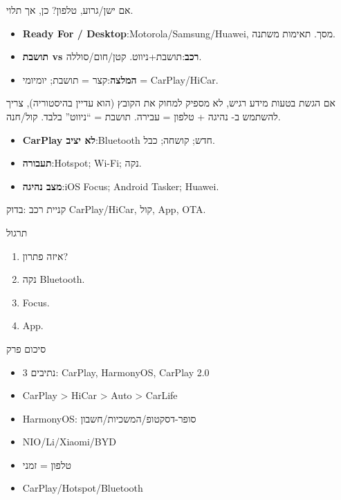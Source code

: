 
אם ישן/גרוע, טלפון? כן, אך תלוי.

\begin{itemize}
  \item \textbf{Ready For / Desktop}:Motorola/Samsung/Huawei, מסך. תאימות משתנה.
  \item \textbf{תושבת vs רכב}:תושבת+ניווט. קטן/חום/סוללה.
  \item \textbf{המלצה}:קצר = תושבת; יומיומי = CarPlay/HiCar.
\end{itemize}

\begin{tcbwarn}{אם הגשת בטעות מידע רגיש, לא מספיק למחוק את הקובץ (הוא עדיין בהיסטוריה), צריך להשתמש ב-}
נהיגה + טלפון = עבירה. תושבת = “ניווט” בלבד. קול/חנה.

\end{tcbwarn}


\begin{itemize}
  \item \textbf{CarPlay לא יציב}:Bluetooth חדש; קושחה; כבל.
  \item \textbf{תעבורה}:Hotspot; Wi-Fi; נקה.
  \item \textbf{מצב נהיגה}:iOS Focus; Android Tasker; Huawei.
\end{itemize}

\begin{tcbinfo}{קניית רכב}
:בדוק CarPlay/HiCar, קול, App, OTA.

\end{tcbinfo}

\begin{tcbpractice}{תרגול}
\begin{enumerate}
  \item איזה פתרון?
  \item נקה Bluetooth.
  \item Focus.
  \item App.
\end{enumerate}

\end{tcbpractice}

\begin{tcbsummary}{סיכום פרק}
\begin{itemize}
  \item 3 נתיבים: CarPlay, HarmonyOS, CarPlay 2.0
  \item CarPlay > HiCar > Auto > CarLife
  \item HarmonyOS: סופר-דסקטופ/המשכיות/חשבון
  \item NIO/Li/Xiaomi/BYD
  \item טלפון = זמני
  \item CarPlay/Hotspot/Bluetooth
\end{itemize}

\end{tcbsummary}
